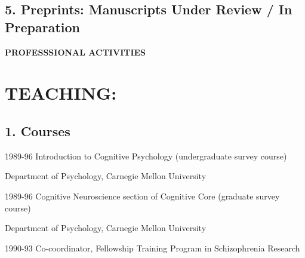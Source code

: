 \documentclass[10 pt]{article}
\begin{document}
\smallskip



\subsection*{5. Preprints: Manuscripts Under Review / In Preparation}
\label{secPUBLICATIONS5}

\begin{refsection}
    \nocite{*}


    \printbibliography[
        heading=none,
        env=jdcounter,
        keyword=preprint
    ]
    
    \printbibliography[
        heading=none,
        keyword=preprint,
        resetnumbers=true
    ]
\end{refsection}


\newpage


    \begin{center}
{\fontsize{15pt}{16 pt}\selectfont \textbf{PROFESSSIONAL ACTIVITIES}}
    \end{center}

\section*{TEACHING:} \label{secTEACHING}
    \smallskip

\subsection*{1. Courses} \label{secTEACHING1}
    \medskip

1989-96 \hspace{0.3in} Introduction to Cognitive Psychology (undergraduate survey course)

\hspace{0.81in} Department of Psychology, Carnegie Mellon University
    \smallskip

1989-96 \hspace{0.3in} Cognitive Neuroscience section of Cognitive Core (graduate survey course)

\hspace{0.81in} Department of Psychology, Carnegie Mellon University
    \smallskip

1990-93 \hspace{0.3in} Co-coordinator, Fellowship Training Program in Schizophrenia Research
\end{document}
